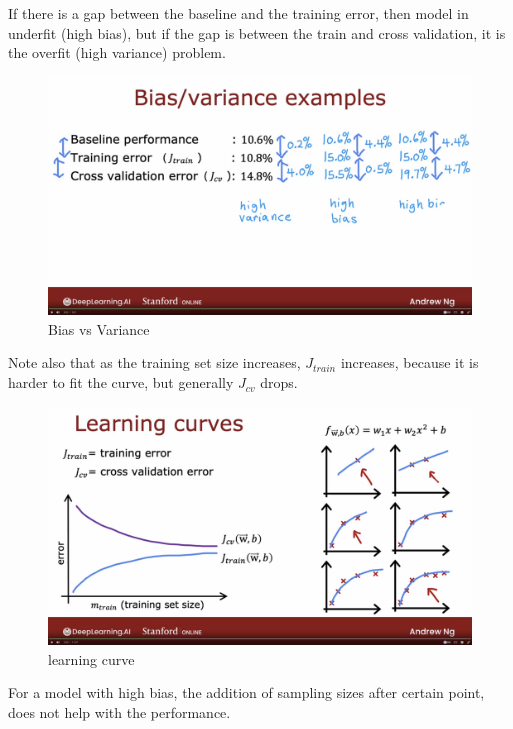 \documentclass[12pt]{report}
\begin{document}
If there is a gap between the baseline and the training error, then model in underfit (high bias), but if the gap is between the train and cross validation, it is the overfit (high variance) problem.

\begin{figure}[H]
  \centering
  \caption{Bias vs Variance}
  \includegraphics[trim =0.0cm 0.0cm 0.0cm 0.0cm, clip, scale=0.12]{pics/biasVariance2.png}
\end{figure}

Note also that as the training set size increases, $J_{train}$ increases, because it is harder to fit the curve, but generally $J_{cv}$ drops.

\begin{figure}[H]
  \centering
  \caption{learning curve}
  \includegraphics[trim =0.0cm 0.0cm 0.0cm 0.0cm, clip, scale=0.12]{pics/LearningCurve.png}
\end{figure}

For a model with high bias, the addition of sampling sizes after certain point, does not help with the performance.
\end{document}
